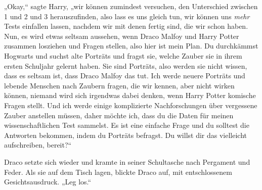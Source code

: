 „Okay,“ sagte Harry, „wir können zumindest versuchen, den Unterschied zwischen 1 und 2 und 3 herauszufinden, also lass es uns gleich tun, wir können uns \emph{mehr} Tests einfallen lassen, nachdem wir mit denen fertig sind, die wir schon haben. Nun, es wird etwas seltsam aussehen, wenn Draco Malfoy und Harry Potter zusammen losziehen und Fragen stellen, also hier ist mein Plan. Du durchkämmst Hogwarts und suchst alte Porträts und fragst sie, welche Zauber sie in ihrem ersten Schuljahr gelernt haben. Sie sind Porträts, also werden sie nicht wissen, dass es seltsam ist, dass Draco Malfoy das tut. Ich werde neuere Porträts und lebende Menschen nach Zaubern fragen, die wir kennen, aber nicht wirken können, niemand wird sich irgendwas dabei denken, wenn Harry Potter komische Fragen stellt. Und ich werde einige komplizierte Nachforschungen über vergessene Zauber anstellen müssen, daher möchte ich, dass du die Daten für meinen wissenschaftlichen Test sammelst. Es ist eine einfache Frage und du solltest die Antworten bekommen, indem du Porträts befragst. Du willst dir das vielleicht aufschreiben, bereit?“

Draco setzte sich wieder und kramte in seiner Schultasche nach Pergament und Feder. Als sie auf dem Tisch lagen, blickte Draco auf, mit entschlossenem Gesichtsausdruck. „Leg los.“


